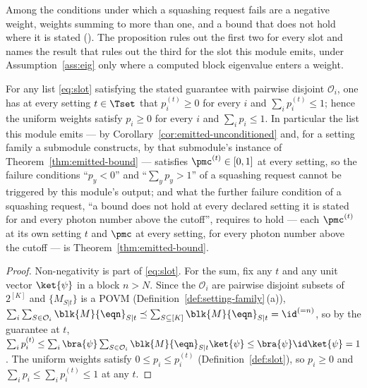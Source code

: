 
Among the conditions under which a squashing request fails are a negative
weight, weights summing to more than one, and a bound that does not hold
where it is stated (). The proposition rules
out the first two for every slot and names the result that rules out the third for the slot this module emits,
under Assumption~\ref{ass:eig} only where a computed block eigenvalue enters a
weight.

\begin{proposition}
\label{prop:slotvalid}
For any list \eqref{eq:slot} satisfying the stated guarantee with pairwise
disjoint $\mathcal{O}_i$, one has at every setting $t\in\Tset$ that
$p^{(t)}_i\ge0$ for every $i$ and $\sum_{i}p^{(t)}_i\le1$; hence the uniform
weights satisfy $p_i\ge0$ for every $i$ and $\sum_{i}p_i\le1$. In particular
the list this module emits --- by Corollary~\ref{cor:emitted-unconditioned}
and, for a setting family a submodule constructs, by that submodule's
instance of Theorem~\ref{thm:emitted-bound} --- satisfies
$\pmc^{(t)}\in[0,1]$ at every setting, so the failure conditions
``$p_y<0$'' and ``$\sum_yp_y>1$'' of a squashing request cannot be triggered
by this module's output; and what the further failure condition of a
squashing request, ``a bound does not hold at every declared setting it is
stated for and every photon number above the cutoff'', requires to hold --- each $\pmc^{(t)}$ at
its own setting $t$ and $\pmc$ at every setting, for every photon number
above the cutoff --- is Theorem~\ref{thm:emitted-bound}.
\end{proposition}

\begin{proof}
Non-negativity is part of \eqref{eq:slot}. For the sum, fix any $t$ and any
unit vector $\ket{\psi}$ in a block $n>N$. Since the $\mathcal{O}_i$ are
pairwise disjoint subsets of $2^{[K]}$ and $\{M_{S|t}\}$ is a POVM
(Definition~\ref{def:setting-family}\,(a)),
$\sum_i\sum_{S\in\mathcal{O}_i}\blk{M}{\eqn}_{S|t}\preceq
\sum_{S\subseteq[K]}\blk{M}{\eqn}_{S|t}=\id^{(=n)}$, so by the guarantee at
$t$,
$\sum_ip^{(t)}_i\le\sum_i\bra{\psi}\sum_{S\in\mathcal{O}_i}\blk{M}{\eqn}_{S|t}\ket{\psi}
\le\bra{\psi}\id\ket{\psi}=1$. The uniform weights satisfy
$0\le p_i\le p^{(t)}_i$ (Definition~\ref{def:slot}), so $p_i\ge0$ and
$\sum_ip_i\le\sum_ip^{(t)}_i\le1$ at any $t$.
\end{proof}
